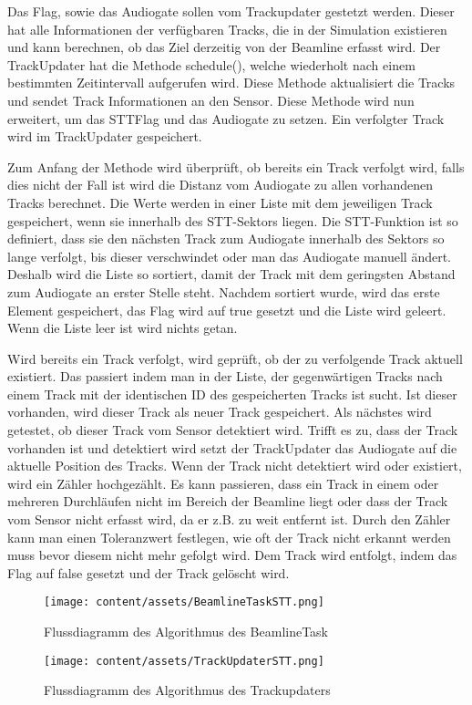 Das Flag, sowie das Audiogate sollen vom Trackupdater gestetzt werden. Dieser hat alle Informationen der verfügbaren Tracks, die in der Simulation 
existieren und kann berechnen, ob das Ziel derzeitig von der Beamline erfasst wird. Der TrackUpdater hat die Methode schedule(), welche wiederholt nach 
einem bestimmten Zeitintervall aufgerufen wird. Diese Methode aktualisiert die Tracks und sendet Track Informationen an den Sensor. Diese Methode wird 
nun erweitert, um das STTFlag und das Audiogate zu setzen. Ein verfolgter Track wird im TrackUpdater gespeichert.

Zum Anfang der Methode wird überprüft, ob bereits ein Track verfolgt wird, falls dies nicht der Fall ist wird die Distanz vom Audiogate zu allen 
vorhandenen Tracks berechnet. Die Werte werden in einer Liste mit dem jeweiligen Track gespeichert, wenn sie innerhalb des STT-Sektors liegen. Die 
STT-Funktion ist so definiert, dass sie den nächsten Track zum Audiogate innerhalb des Sektors so lange verfolgt, bis dieser verschwindet oder man das 
Audiogate manuell ändert. Deshalb wird die Liste so sortiert, damit der Track mit dem geringsten Abstand zum Audiogate an erster Stelle steht. Nachdem 
sortiert wurde, wird das erste Element gespeichert, das Flag wird auf true gesetzt und die Liste wird geleert. Wenn die Liste leer ist wird nichts getan. 

Wird bereits ein Track verfolgt, wird geprüft, ob der zu verfolgende Track aktuell existiert. Das passiert indem man in der Liste, der gegenwärtigen 
Tracks nach einem Track mit der identischen ID des gespeicherten Tracks ist sucht. Ist dieser vorhanden, wird dieser Track als neuer Track gespeichert. 
Als nächstes wird getestet, ob dieser Track vom Sensor detektiert wird.  Trifft es zu, dass der Track vorhanden ist und detektiert wird setzt der 
TrackUpdater das Audiogate auf die aktuelle Position des Tracks. Wenn der Track nicht detektiert wird oder existiert, wird ein Zähler hochgezählt. Es 
kann passieren, dass ein Track in einem oder mehreren Durchläufen nicht im Bereich der Beamline liegt oder dass der Track vom Sensor nicht erfasst wird, 
da er z.B. zu weit entfernt ist. Durch den Zähler kann man einen Toleranzwert festlegen, wie oft der Track nicht erkannt werden muss bevor diesem nicht 
mehr gefolgt wird. Dem Track wird entfolgt, indem das Flag auf false gesetzt und der Track gelöscht wird.

\begin{figure}[h]
    \centering
    \texttt{[image: content/assets/BeamlineTaskSTT.png]}
    \caption{Flussdiagramm des Algorithmus des BeamlineTask}
\end{figure}

\begin{figure}[h]
    \centering
    \texttt{[image: content/assets/TrackUpdaterSTT.png]}
    \caption{Flussdiagramm des Algorithmus des Trackupdaters}
\end{figure}

